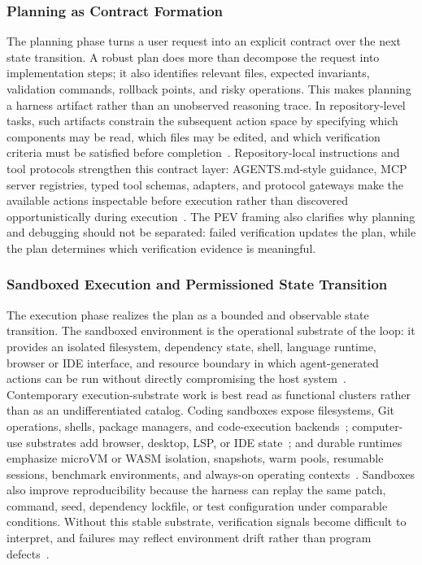 \documentclass{llmxive}
\begin{document}
\subsubsection{Planning as Contract Formation}
The planning phase turns a user request into an explicit contract over the next state transition. A robust plan does more than decompose the request into implementation steps; it also identifies relevant files, expected invariants, validation commands, rollback points, and risky operations. This makes planning a harness artifact rather than an unobserved reasoning trace. In repository-level tasks, such artifacts constrain the subsequent action space by specifying which components may be read, which files may be edited, and which verification criteria must be satisfied before completion~\cite{jiang2024selfplanning, bairi2024codeplan, islam2024mapcoder}. Repository-local instructions and tool protocols strengthen this contract layer: AGENTS.md-style guidance, MCP server registries, typed tool schemas, adapters, and protocol gateways make the available actions inspectable before execution rather than discovered opportunistically during execution~\cite{agentsmd2026,mcpservers2026,modelcontextprotocol2026,langchainmcpadapters2026,RayASO,hou2025model,li2025glue,contextforge2026}. The PEV framing also clarifies why planning and debugging should not be separated: failed verification updates the plan, while the plan determines which verification evidence is meaningful.

\subsubsection{Sandboxed Execution and Permissioned State Transition}
The execution phase realizes the plan as a bounded and observable state transition. The sandboxed environment is the operational substrate of the loop: it provides an isolated filesystem, dependency state, shell, language runtime, browser or IDE interface, and resource boundary in which agent-generated actions can be run without directly compromising the host system~\cite{vijayvargiya2025openagentsafety, cheng2026llm}. Contemporary execution-substrate work is best read as functional clusters rather than as an undifferentiated catalog. Coding sandboxes expose filesystems, Git operations, shells, package managers, and code-execution backends~\cite{daytona2026,e2b2026,alibabaopensandbox2026,judge02026,swerex2026,wang2025openhands}; computer-use substrates add browser, desktop, LSP, or IDE state~\cite{trycua2026,browserharness2026,e2bdesktop2026,agentinfrasandbox2026,agentscoperuntime2026}; and durable runtimes emphasize microVM or WASM isolation, snapshots, warm pools, resumable sessions, benchmark environments, and always-on operating contexts~\cite{tensorlake2026,arrakis2025,capsule2026,kubernetesagentsandbox2026,sandboxedsh2026,terminalbenchenv2026,stakpakagent2026}. Sandboxes also improve reproducibility because the harness can replay the same patch, command, seed, dependency lockfile, or test configuration under comparable conditions. Without this stable substrate, verification signals become difficult to interpret, and failures may reflect environment drift rather than program defects~\cite{wang2025openhands, feng2026longcli,anthropicinfranoise2026}.
\end{document}
